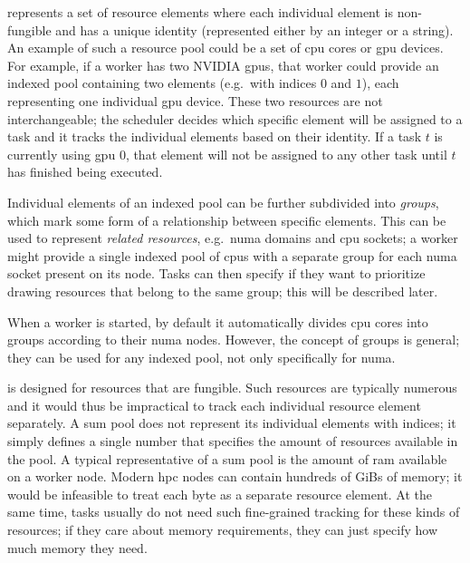 \begin{description}[wide=0pt]
	\item [Indexed pool] represents a set of resource elements where each individual element is
	      non-fungible and has a unique identity (represented either by an integer or a string). An example
	      of such a resource pool could be a set of \gls{cpu} cores or \gls{gpu}
	      devices. For example, if a worker has two NVIDIA \glspl{gpu}, that worker could provide
	      an indexed pool containing two elements (e.g.\ with indices $0$ and
	      $1$), each representing one individual \gls{gpu} device. These two
	      resources are not interchangeable; the scheduler decides which specific element will be assigned to
	      a task and it tracks the individual elements based on their identity. If a task
	      $t$ is currently using \gls{gpu} $0$, that
	      element will not be assigned to any other task until $t$ has finished being
	      executed.

	      Individual elements of an indexed pool can be further subdivided into \emph{groups}, which
	      mark some form of a relationship between specific elements. This can be used to represent
	      \emph{related resources}, e.g.\ \gls{numa} domains and \gls{cpu} sockets; a
	      worker might provide a single indexed pool of \glspl{cpu} with a separate group for each
	      \gls{numa} socket present on its node. Tasks can then specify if they want to
	      prioritize drawing resources that belong to the same group; this will be described later.

	      When a worker is started, by default it automatically divides \gls{cpu} cores into
	      groups according to their \gls{numa} nodes. However, the concept of groups is general;
	      they can be used for any indexed pool, not only specifically for \gls{numa}.
	\item [Sum pool] is designed for resources that are fungible. Such resources are typically
	      numerous and it would thus be impractical to track each individual resource element separately. A
	      sum pool does not represent its individual elements with indices; it simply defines a single number
	      that specifies the amount of resources available in the pool. A typical representative of a sum
	      pool is the amount of \gls{ram} available on a worker node. Modern
	      \gls{hpc} nodes can contain hundreds of GiBs of memory; it would be infeasible to
	      treat each byte as a separate resource element. At the same time, tasks usually do not need such
	      fine-grained tracking for these kinds of resources; if they care about memory requirements, they
	      can just specify how much memory they need.
\end{description}

